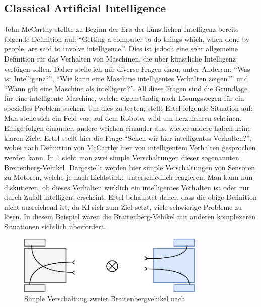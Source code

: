         \subsection{Classical Artificial Intelligence}\label{subsec:cai}
            John McCarthy stellte zu Beginn der Era der künstlichen Intelligenz bereits folgende Definition
            auf: ``Getting a computer to do things which, when done by people, are said to involve intelligence.''.
            \cite[p. 1]{ertel2016grundkurs} Dies ist jedoch eine sehr allgemeine Definition für das
            Verhalten von Maschinen, die über künstliche Intelligenz verfügen sollen. Daher stelle ich mir
            diverse Fragen dazu, unter Anderem: ``Was ist Intelligenz?'', ``Wie kann eine Maschine intelligentes
            Verhalten zeigen?'' und ``Wann gilt eine Maschine als intelligent?''. All diese Fragen sind die
            Grundlage für eine intelligente Maschine, welche eigenständig nach Lösungswegen für ein spezielles
            Problem suchen. Um dies zu testen, stellt Ertel folgende Situation auf: Man stelle sich ein Feld
            vor, auf dem Roboter wild um herzufahren scheinen. Einige folgen einander, andere weichen einander
            aus, wieder andere haben keine klaren Ziele. \cite[p. 2]{ertel2016grundkurs} Ertel stellt hier die
            Frage ``Sehen wir hier intelligentes Verhalten?'', wobei nach Definition von McCarthy hier von
            intelligentem Verhalten gesprochen werden kann. In \ref{pic:braitenberg-vehikel} sieht man zwei
            simple Verschaltungen dieser sogenannten Breitenberg-Vehikel. Dargestellt werden hier simple
            Verschaltungen von Sensoren zu Motoren, welche je nach Lichtstärke unterschiedlich reagieren.
            Man kann nun diskutieren, ob dieses Verhalten wirklich ein intelligentes Verhalten ist oder
            nur durch Zufall intelligent erscheint. Ertel behauptet daher, dass die obige Definition nicht
            ausreichend ist, da KI sich zum Ziel setzt, viele schwierige Probleme zu lösen. In diesem Beispiel
            wären die Braitenberg-Vehikel mit anderen komplexeren Situationen sichtlich überfordert.

            \begin{figure}[h]
                \begin{center}
                    \includegraphics[width=0.8\textwidth]{figures/braitenberg-roboter.png}
                    \caption[Verschaltung Braitenberg-Vehikel]{Simple Verschaltung zweier Braitenbergvehikel nach \cite{ertel2016grundkurs}}
                    \label{pic:braitenberg-vehikel}
                \end{center}
            \end{figure}

